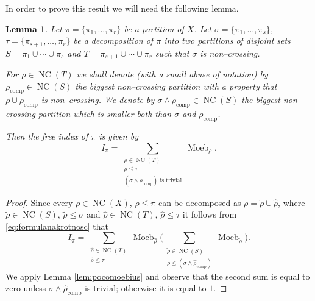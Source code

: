 \documentclass[12pt,dvips]{amsart}
\numberwithin{equation}{section} \numberwithin{figure}{section}
\theoremstyle{plain}
\newtheorem{lemma}{Lemma}[section]
\theoremstyle{definition}
\theoremstyle{remark}
\DeclareMathOperator{\comp}{comp}
\DeclareMathOperator{\NC}{NC}
\DeclareMathOperator{\Moeb}{Moeb}
\begin{document}
In order to prove this result we will need the following lemma.

\begin{lemma}
\label{lem:fundamentalny} Let $\pi=\{\pi_1,\dots,\pi_r\}$ be a
partition of $X$. Let $\sigma=\{\pi_1,\dots,\pi_s\}$,
$\tau=\{\pi_{s+1},\dots,\pi_r\}$ be a decomposition of $\pi$ into
two partitions of disjoint sets $S=\pi_1\cup\cdots\cup\pi_s$ and
$T=\pi_{s+1}\cup\cdots\cup\pi_{r}$ such that $\sigma$ is
non--crossing.

For $\rho\in\NC(T)$ we shall denote (with a small abuse of notation)
by $\rho_{\comp}\in\NC(S)$ the biggest non--crossing partition with
a property that $\rho\cup\rho_{\comp}$ is non--crossing. We denote
by $\sigma\wedge\rho_{\comp}\in\NC(S)$ the biggest non--crossing
partition which is smaller both than $\sigma$ and $\rho_{\comp}$.

Then the free index of $\pi$ is given by
\begin{equation}
\label{eq:uproszczeniekumulanty}
I_{\pi}=\sum_{\substack{\rho\in\NC(T)\\ \rho\leq \tau
\\ (\sigma \wedge \rho_{\comp}) \text{ is trivial}  }}
  \Moeb_{\rho}.
\end{equation}
\end{lemma}
\begin{proof}
Since every $\rho\in\NC(X)$, $\rho\leq \pi$  can be decomposed as
$\rho=\tilde{\rho}\cup\hat{\rho}$, where $\tilde{\rho}\in\NC(S)$,
$\tilde{\rho}\leq \sigma$ and $\hat{\rho}\in\NC(T)$, $\hat{\rho}\leq
\tau$ it follows from \eqref{eq:formulanakrotnosc} that
$$ I_{\pi}=\sum_{\substack{\hat{\rho}\in \NC(T)\\ \hat{\rho}\leq \tau}}  \Moeb_{\hat{\rho}}
\Big( \sum_{\substack{  \tilde{\rho}\in \NC(S) \\ \tilde{\rho} \leq
(\sigma\wedge \hat{\rho}_{\comp}) }} \Moeb_{\tilde{\rho}} \Big).
$$
We apply Lemma \ref{lem:pocomoebius} and observe that the second sum
is equal to zero unless $\sigma\wedge\hat{\rho}_{\comp}$ is trivial;
otherwise it is equal to $1$.
\end{proof}
\end{document}
